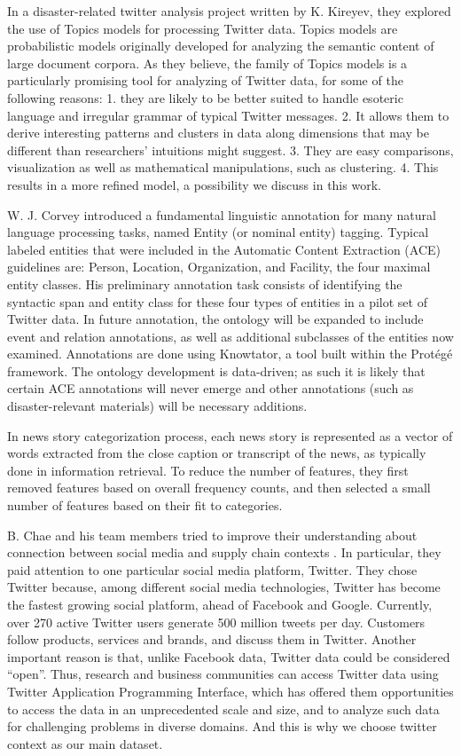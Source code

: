 \documentclass[conference]{IEEEtran}
\begin{document}
In a disaster-related twitter analysis project written by K. Kireyev, they explored the use of Topics models for processing Twitter data\cite{Kireyev}. Topics models are probabilistic models originally developed for analyzing the semantic content of large document corpora. As they believe, the family of Topics models is a particularly promising tool for analyzing of Twitter data, for some of the following reasons: 1. they are likely to be better suited to handle esoteric language and irregular grammar of typical Twitter messages. 2. It allows them to derive interesting patterns and clusters in data along dimensions that may be different than researchers' intuitions might suggest. 3. They are easy comparisons, visualization as well as mathematical manipulations, such as clustering. 4. This results in a more refined model, a possibility we discuss in this work.

W. J. Corvey introduced a fundamental linguistic annotation for many natural language processing tasks, named Entity (or nominal entity) tagging\cite{Corvey}. Typical labeled entities that were included in the Automatic Content Extraction (ACE) guidelines are: Person, Location, Organization, and Facility, the four maximal entity classes. His preliminary annotation task consists of identifying the syntactic span and entity class for these four types of entities in a pilot set of Twitter data. In future annotation, the ontology will be expanded to include event and relation annotations, as well as additional subclasses of the entities now examined. Annotations are done using Knowtator, a tool built within the Protégé framework. The ontology development is data-driven; as such it is likely that certain ACE annotations will never emerge and other annotations (such as disaster-relevant materials) will be necessary additions.

In news story categorization process\cite{Qi}, each news story is represented as a vector of words extracted from the close caption or transcript of the news, as typically done in information retrieval. To reduce the number of features, they first removed features based on overall frequency counts, and then selected a small number of features based on their fit to categories.

B. Chae and his team members tried to improve their understanding about connection between social media and supply chain contexts \cite{Chae}. In particular, they paid attention to one particular social media platform, Twitter. They chose Twitter because, among different social media technologies, Twitter has become the fastest growing social platform, ahead of Facebook and Google. Currently, over 270 active Twitter users generate 500 million tweets per day. Customers follow products, services and brands, and discuss them in Twitter. Another important reason is that, unlike Facebook data, Twitter data could be considered “open”. Thus, research and business communities can access Twitter data using Twitter Application Programming Interface, which has offered them opportunities to access the data in an unprecedented scale and size, and to analyze such data for challenging problems in diverse domains. And this is why we choose twitter context as our main dataset.
\vspace{1.0em}
\end{document}
